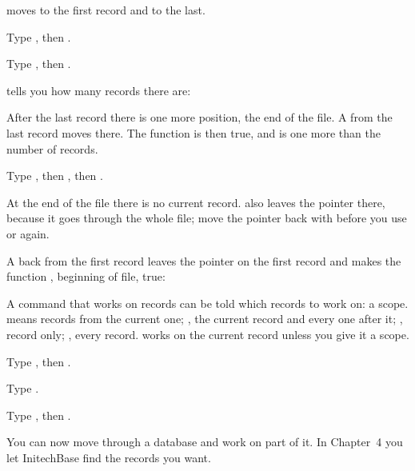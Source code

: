  moves to the first record and  to the last.
\begin{Steps}[resume]
\item Type , then .
\item Type , then .
\end{Steps}
 tells you how many records there are:

After the last record there is one more position, the end of the file.  A
 from the last record moves there.  The function  is then
true, and  is one more than the number of records.
\begin{Steps}[resume]
\item Type , then , then .
\end{Steps}
At the end of the file there is no current record.   also leaves the
pointer there, because it goes through the whole file; move the pointer back
with  before you use  or  again.

A  back from the first record leaves the pointer on the first record
and makes the function , beginning of file, true:

A command that works on records can be told which records to work on: a scope.
  means  records from the current one; , the
current record and every one after it;  , record  only;
, every record.   works on the current record unless you
give it a scope.
\begin{Steps}[resume]
\item Type , then .
\item Type .
\end{Steps}
\begin{Steps}[resume]
\item Type , then .
\end{Steps}

You can now move through a database and work on part of it.  In Chapter~4 you
let InitechBase find the records you want.

